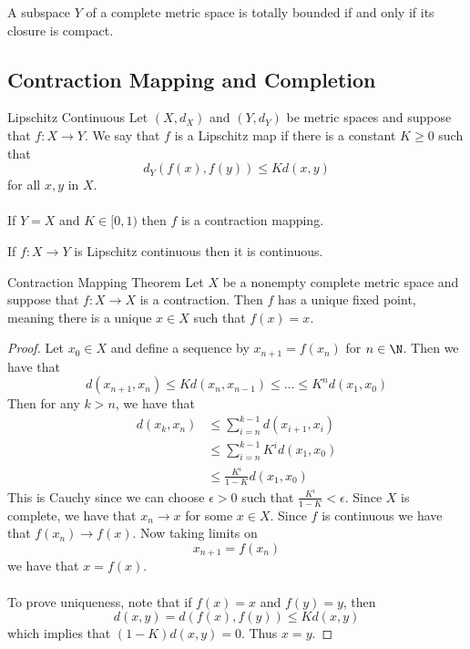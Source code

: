 \documentclass[a4paper]{article}
\begin{document}
\begin{thm}{}{} A subspace $Y$ of a complete metric space is totally bounded if and only if its closure is compact. 
\end{thm}

\subsection{Contraction Mapping and Completion}
\begin{defn}{Lipschitz Continuous}{} Let $(X,d_X)$ and $(Y,d_Y)$ be metric spaces and suppose that $f:X\to Y$. We say that $f$ is a Lipschitz map if there is a constant $K\geq 0$ such that $$d_Y(f(x),f(y))\leq Kd(x,y)$$ for all $x,y$ in $X$. \\~\\
If $Y=X$ and $K\in[0,1)$ then $f$ is a contraction mapping. 
\end{defn}

\begin{lmm}{}{} If $f:X\to Y$ is Lipschitz continuous then it is continuous. 
\end{lmm}

\begin{thm}{Contraction Mapping Theorem}{} Let $X$ be a nonempty complete metric space and suppose that $f:X\to X$ is a contraction. Then $f$ has a unique fixed point, meaning there is a unique $x\in X$ such that $f(x)=x$. \tcbline
\begin{proof}
Let $x_0\in X$ and define a sequence by $x_{n+1}=f(x_n)$ for $n\in\N$. Then we have that $$d(x_{n+1},x_n)\leq Kd(x_n,x_{n-1})\leq\dots\leq K^nd(x_1,x_0)$$ Then for any $k>n$, we have that 
\begin{align*}
d(x_k,x_n)&\leq\sum_{i=n}^{k-1}d(x_{i+1},x_i)\\
&\leq\sum_{i=n}^{k-1}K^id(x_1,x_0)\\
&\leq\frac{K^i}{1-K}d(x_1,x_0)
\end{align*}
This is Cauchy since we can choose $\epsilon>0$ such that $\frac{K^i}{1-K}<\epsilon$. Since $X$ is complete, we have that $x_n\to x$ for some $x\in X$. Since $f$ is continuous we have that $f(x_n)\to f(x)$. Now taking limits on $$x_{n+1}=f(x_n)$$ we have that $x=f(x)$. \\~\\
To prove uniqueness, note that if $f(x)=x$ and $f(y)=y$, then $$d(x,y)=d(f(x),f(y))\leq Kd(x,y)$$ which implies that $(1-K)d(x,y)=0$. Thus $x=y$. 
\end{proof}
\end{thm}
\end{document}
